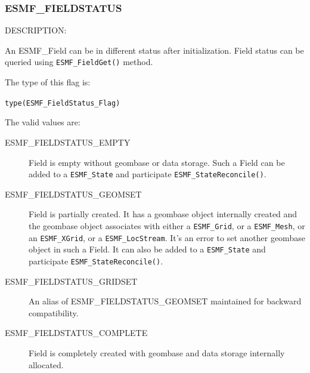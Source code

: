 
\subsubsection{ESMF\_FIELDSTATUS}
\label{const:fieldstatus}

{\sf DESCRIPTION:\\}  
\begin{sloppypar}
An {ESMF\_Field} can be in different status after initialization. Field status can be queried using {\tt ESMF\_FieldGet()} method.
\end{sloppypar}

The type of this flag is:

{\tt type(ESMF\_FieldStatus\_Flag)}

The valid values are:
\begin{description}
\item [ESMF\_FIELDSTATUS\_EMPTY]
      Field is empty without geombase or data storage. Such a Field can be added to a {\tt ESMF\_State} and participate {\tt ESMF\_StateReconcile()}. 
\item [ESMF\_FIELDSTATUS\_GEOMSET]
      Field is partially created. It has a geombase object internally created and the geombase object associates with either a {\tt ESMF\_Grid}, or a {\tt ESMF\_Mesh}, or an {\tt ESMF\_XGrid}, or a {\tt ESMF\_LocStream}. It's an error to set another geombase object in such a Field. It can also be added to a {\tt ESMF\_State} and participate {\tt ESMF\_StateReconcile()}.
\item [ESMF\_FIELDSTATUS\_GRIDSET]
      An alias of ESMF\_FIELDSTATUS\_GEOMSET maintained for backward compatibility.
\item [ESMF\_FIELDSTATUS\_COMPLETE]
      Field is completely created with geombase and data storage internally allocated. 
\end{description}
